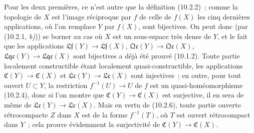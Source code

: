 Pour les deux premières, ce n'est autre que la définition (10.2.2)~; comme la
topologie de $X$ est l'image réciproque par $f$ de celle de $f(X)$ les cinq
dernières applications, où l'on remplace $Y$ par $f(X)$, sont bijectives. On
peut donc (par (10.2.1, \emph{b)})) se borner au cas où $X$ est un sous-espace
très dense de $Y$, et le fait que les applications
$\mathfrak{Lf}(Y)\to\mathfrak{Lf}(X)$,
$\mathfrak{Qc}(Y)\to\mathfrak{Qc}(X)$,
$\mathfrak{Lqc}(Y)\to\mathfrak{Lqc}(X)$ sont bijectives a déjà été prouvé
(10.1.2). Toute partie localement constructible étant localement
quasi-constructible, les applications $\mathfrak C(Y)\to\mathfrak C(X)$ et
$\mathfrak{Lc}(Y)\to\mathfrak{Lc}(X)$ sont injectives~; en outre, pour tout
ouvert $U\subset Y$, la restriction $f^{-1}(U)\to U$ de $f$ est un
quasi-homéomorphisme (10.2.4), donc si l'on montre que
$\mathfrak C(Y)\to\mathfrak C(X)$ est surjective, il en sera de même de
$\mathfrak{Lc}(Y)\to\mathfrak{Lc}(X)$. Mais en vertu de (10.2.6), toute partie
ouverte rétrocompacte $Z$ dans $X$ est de la forme $f^{-1}(T)$, où $T$ est
ouvert rétrocompact dans $Y$~; cela prouve évidemment la surjectivité de
$\mathfrak C(Y)\to\mathfrak C(X)$.

